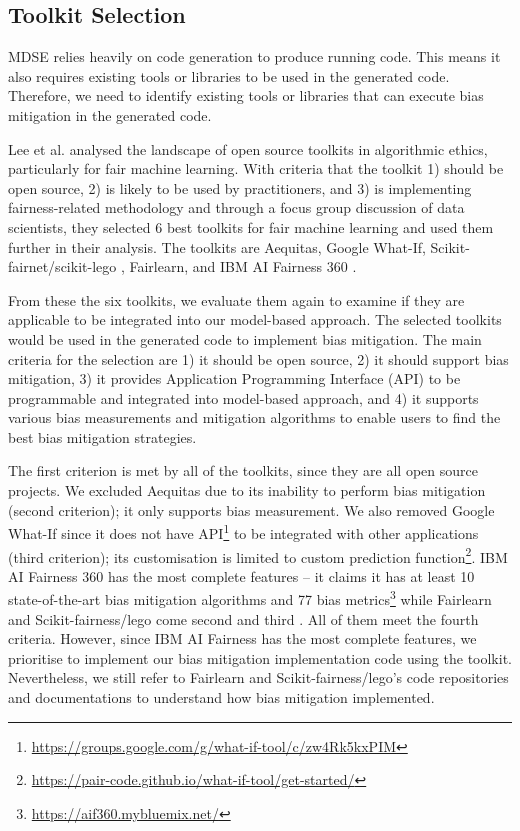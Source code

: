 \documentclass[sigconf,review]{acmart}
\begin{document}
\subsection{Toolkit Selection}
\label{sec:toolkit_selection}
MDSE relies heavily on code generation to produce running code. This means it also requires existing tools or libraries to be used in the generated code. Therefore, we need to identify existing tools or libraries that can execute bias mitigation in the generated code. 

Lee et al. \cite{lee2021landscape} analysed the landscape of open source toolkits in algorithmic ethics, particularly for fair machine learning. With criteria that the toolkit 1) should be open source, 2) is likely to be used by practitioners, and 3) is implementing fairness-related methodology and through a focus group discussion of data scientists, they selected 6 best toolkits for fair machine learning and used them further in their analysis. The toolkits are Aequitas\cite{saleiro2019aequitas}, Google What-If\cite{googlewhatif2020}, Scikit-fairnet/scikit-lego \cite{scikitfairness2022,scikitlego2022}, Fairlearn\cite{bird2020fairlearn}, and IBM AI Fairness 360 \cite{bellamy2018ai}.  

From these the six toolkits, we evaluate them again to examine if they are applicable to be integrated into our model-based approach. The selected toolkits would be used in the generated code to implement bias mitigation. The main criteria for the selection are 1) it should be open source, 2) it should support bias mitigation, 3) it provides Application Programming Interface (API) to be programmable and integrated into model-based approach, and 4) it supports various bias measurements and mitigation algorithms to enable users to find the best bias mitigation strategies. 

The first criterion is met by all of the toolkits, since they are all open source projects. We excluded Aequitas due to its inability to perform bias mitigation (second criterion); it only supports bias measurement. We also removed Google What-If since it does not have API\footnote{\url{https://groups.google.com/g/what-if-tool/c/zw4Rk5kxPIM}} to be integrated with other applications (third criterion); its customisation is limited to custom prediction function\footnote{\url{https://pair-code.github.io/what-if-tool/get-started/}}. IBM AI Fairness 360 has the most complete features -- it claims it has at least 10 state-of-the-art bias mitigation algorithms and 77 bias metrics\footnote{\url{https://aif360.mybluemix.net/}} while Fairlearn and Scikit-fairness/lego come second and third \cite{lee2021landscape}. All of them meet the fourth criteria. However, since IBM AI Fairness has the most complete features, we prioritise to implement our bias mitigation implementation code using the toolkit. Nevertheless, we still refer to Fairlearn and Scikit-fairness/lego's code repositories and documentations to understand how bias mitigation implemented. 
\end{document}
